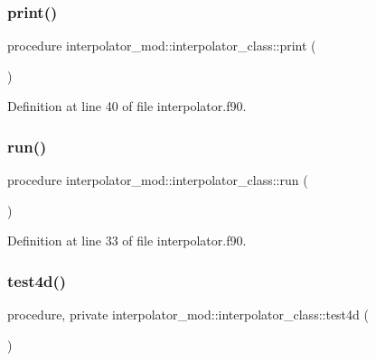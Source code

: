 \subsubsection{\texorpdfstring{print()}{print()}}
{\footnotesize\ttfamily procedure interpolator\+\_\+mod\+::interpolator\+\_\+class\+::print (\begin{DoxyParamCaption}{ }\end{DoxyParamCaption})\hspace{0.3cm}{\ttfamily [private]}}



Definition at line 40 of file interpolator.\+f90.

\mbox{\label{structinterpolator__mod_1_1interpolator__class_a1080aca342174069db9c5639853d5dc0}} 
\subsubsection{\texorpdfstring{run()}{run()}}
{\footnotesize\ttfamily procedure interpolator\+\_\+mod\+::interpolator\+\_\+class\+::run (\begin{DoxyParamCaption}{ }\end{DoxyParamCaption})\hspace{0.3cm}{\ttfamily [private]}}



Definition at line 33 of file interpolator.\+f90.

\mbox{\label{structinterpolator__mod_1_1interpolator__class_a2132c8be561d2afa1c369b9471a81e38}} 
\subsubsection{\texorpdfstring{test4d()}{test4d()}}
{\footnotesize\ttfamily procedure, private interpolator\+\_\+mod\+::interpolator\+\_\+class\+::test4d (\begin{DoxyParamCaption}{ }\end{DoxyParamCaption})\hspace{0.3cm}{\ttfamily [private]}}



